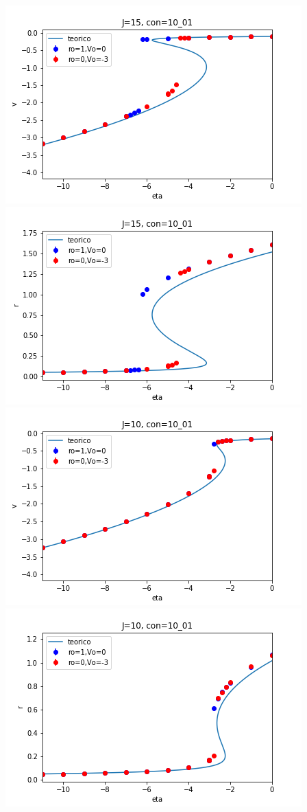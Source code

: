 \documentclass[a4paper]{article}
\begin{document}
\includegraphics[scale=0.7]{v_vs_eta_J15_mod10_01.png}\\
\includegraphics[scale=0.7]{r_vs_eta_J15_mod10_01.png}\\
\includegraphics[scale=0.7]{v_vs_eta_J10_mod10_01.png}\\
\includegraphics[scale=0.7]{r_vs_eta_J10_mod10_01.png}\\
\end{document}
